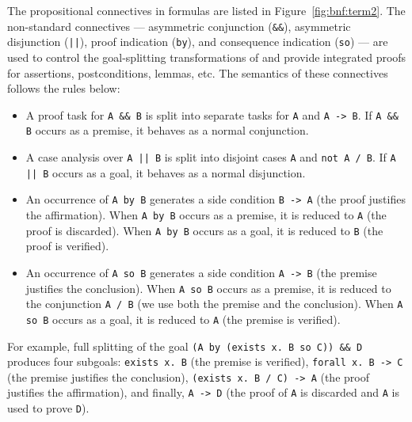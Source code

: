 The propositional connectives in \whyml formulas are listed in
Figure~\ref{fig:bnf:term2}. The non-standard connectives ---
asymmetric conjunction (\texttt{\&\&}), asymmetric disjunction
(\texttt{||}), proof indication (\texttt{by}), and consequence
indication (\texttt{so}) --- are used to control the goal-splitting
transformations of \why and provide integrated proofs for
\whyml assertions, postconditions, lemmas, etc.
The semantics of these connectives
follows the rules below:
\begin{itemize}
\item A proof task for \texttt{A \&\& B} is split into
separate tasks for \texttt{A} and \texttt{A -> B}.
If \texttt{A \&\& B} occurs as a premise, it behaves
as a normal conjunction.
\item A case analysis over \texttt{A || B} is split into
disjoint cases \texttt{A} and \texttt{not A {/} B}.
If \texttt{A || B} occurs as a goal, it behaves
as a normal disjunction.
\item An occurrence of \texttt{A by B} generates a side condition
\texttt{B -> A} (the proof justifies the affirmation).
When \texttt{A by B} occurs as a premise,
it is reduced to \texttt{A} (the proof is discarded).
When \texttt{A by B} occurs as a goal,
it is reduced to \texttt{B} (the proof is verified).
\item An occurrence of \texttt{A so B} generates a side condition
\texttt{A -> B} (the premise justifies the conclusion).
When \texttt{A so B} occurs as a premise,
it is reduced to the conjunction \mbox{\texttt{A {/} B}}
(we use both the premise and the conclusion).
When \texttt{A so B} occurs as a goal,
it is reduced to \texttt{A} (the premise is verified).
\end{itemize}
For example, full splitting of the goal
\texttt{(A by (exists x. B so C)) \&\& D}
produces four subgoals:
\texttt{exists x. B} (the premise is verified),
\texttt{forall x. B -> C} (the premise justifies the conclusion),
\texttt{(exists x. B {/} C) -> A} (the proof justifies the affirmation),
and finally, \texttt{A -> D} (the proof of \texttt{A} is discarded
and \texttt{A} is used to prove \texttt{D}).

